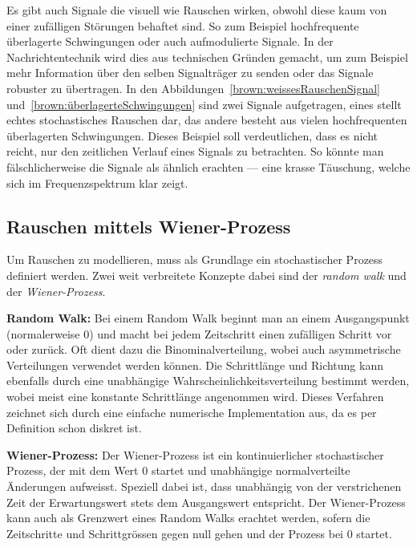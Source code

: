 Es gibt auch Signale die visuell wie Rauschen wirken, obwohl diese kaum von einer zufälligen Störungen behaftet sind. So zum Beispiel hochfrequente überlagerte Schwingungen oder auch aufmodulierte Signale. In der Nachrichtentechnik wird dies aus technischen Gründen gemacht, um zum Beispiel mehr Information über den selben Signalträger zu senden oder das Signale robuster zu übertragen. In den Abbildungen~\ref{brown:weissesRauschenSignal} und~\ref{brown:überlagerteSchwingungen} sind zwei Signale aufgetragen, eines stellt echtes stochastisches Rauschen dar, das andere besteht aus vielen hochfrequenten überlagerten Schwingungen. Dieses Beispiel soll verdeutlichen, dass es nicht reicht, nur den zeitlichen Verlauf eines Signals zu betrachten. So könnte man fälschlicherweise die Signale als ähnlich erachten --- eine krasse Täuschung, welche sich im Frequenzspektrum klar zeigt. 



\subsection{Rauschen mittels Wiener-Prozess\label{brown:Rauschen:RandomWalkWiener}}

Um Rauschen zu modellieren, muss als Grundlage ein stochastischer Prozess definiert werden. Zwei weit verbreitete Konzepte dabei sind der \textit{random walk} und der \textit{Wiener-Prozess}.

\begin{definition}\textbf{Random Walk:}
	\label{randomWalk}
	Bei einem Random Walk beginnt man an einem Ausgangspunkt (normalerweise 0) und macht bei jedem Zeitschritt einen zufälligen Schritt vor oder zurück. Oft dient dazu die Binominalverteilung, wobei auch asymmetrische Verteilungen verwendet werden können. Die Schrittlänge und Richtung kann ebenfalls durch eine unabhängige Wahrscheinlichkeitsverteilung bestimmt werden, wobei meist eine konstante Schrittlänge angenommen wird. Dieses Verfahren zeichnet sich durch eine einfache numerische Implementation aus, da es per Definition schon diskret ist.
\end{definition}

\begin{definition}\textbf{Wiener-Prozess:}
	\label{wienerprozess}
	Der Wiener-Prozess ist ein kontinuierlicher stochastischer Prozess, der mit dem Wert 0 startet und unabhängige normalverteilte Änderungen aufweisst. Speziell dabei ist, dass unabhängig von der verstrichenen Zeit der Erwartungswert stets dem Ausgangswert entspricht. Der Wiener-Prozess kann auch als Grenzwert eines Random Walks erachtet werden, sofern die Zeitschritte und Schrittgrössen gegen null gehen und der Prozess bei 0 startet.
\end{definition}

